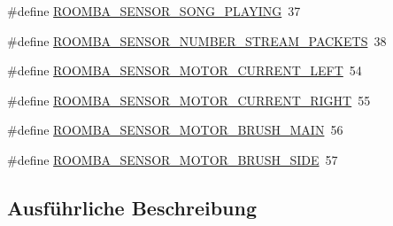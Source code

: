 \begin{DoxyCompactItemize}
\item 
\#define \hyperlink{group__roomba__sensor__intern_gadc00d563593ae5d1de005982df2896e9}{R\-O\-O\-M\-B\-A\-\_\-\-S\-E\-N\-S\-O\-R\-\_\-\-S\-O\-N\-G\-\_\-\-P\-L\-A\-Y\-I\-N\-G}~37
\item 
\#define \hyperlink{group__roomba__sensor__intern_gaa3e69ebb1e0a7a12ac5d7cc3a5429c91}{R\-O\-O\-M\-B\-A\-\_\-\-S\-E\-N\-S\-O\-R\-\_\-\-N\-U\-M\-B\-E\-R\-\_\-\-S\-T\-R\-E\-A\-M\-\_\-\-P\-A\-C\-K\-E\-T\-S}~38
\item 
\#define \hyperlink{group__roomba__sensor__intern_ga230f21929397657b919cc3862f7482ba}{R\-O\-O\-M\-B\-A\-\_\-\-S\-E\-N\-S\-O\-R\-\_\-\-M\-O\-T\-O\-R\-\_\-\-C\-U\-R\-R\-E\-N\-T\-\_\-\-L\-E\-F\-T}~54
\item 
\#define \hyperlink{group__roomba__sensor__intern_ga11625bf945cef37a45d3edf9f36887d5}{R\-O\-O\-M\-B\-A\-\_\-\-S\-E\-N\-S\-O\-R\-\_\-\-M\-O\-T\-O\-R\-\_\-\-C\-U\-R\-R\-E\-N\-T\-\_\-\-R\-I\-G\-H\-T}~55
\item 
\#define \hyperlink{group__roomba__sensor__intern_ga4c173abafe12ade9b1b5f09fc09ce334}{R\-O\-O\-M\-B\-A\-\_\-\-S\-E\-N\-S\-O\-R\-\_\-\-M\-O\-T\-O\-R\-\_\-\-B\-R\-U\-S\-H\-\_\-\-M\-A\-I\-N}~56
\item 
\#define \hyperlink{group__roomba__sensor__intern_gaafa89ba622b84dee83a9328a64e2b669}{R\-O\-O\-M\-B\-A\-\_\-\-S\-E\-N\-S\-O\-R\-\_\-\-M\-O\-T\-O\-R\-\_\-\-B\-R\-U\-S\-H\-\_\-\-S\-I\-D\-E}~57
\end{DoxyCompactItemize}


\subsection{Ausführliche Beschreibung}



